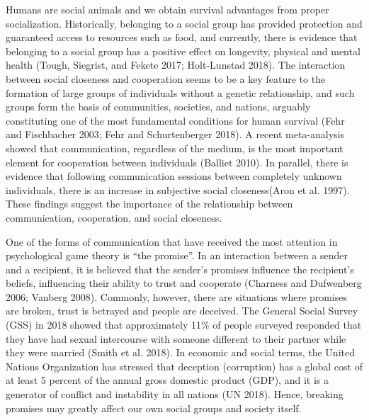 \documentclass[smallextended]{svjour3}       %
\begin{document}
Humans are social animals and we obtain survival advantages from proper
socialization. Historically, belonging to a social group has provided
protection and guaranteed access to resources such as food, and
currently, there is evidence that belonging to a social group has a
positive effect on longevity, physical and mental health (Tough,
Siegrist, and Fekete 2017; Holt-Lunstad 2018). The interaction between
social closeness and cooperation seems to be a key feature to the
formation of large groups of individuals without a genetic relationship,
and such groups form the basis of communities, societies, and nations,
arguably constituting one of the most fundamental conditions for human
survival (Fehr and Fischbacher 2003; Fehr and Schurtenberger 2018). A
recent meta-analysis showed that communication, regardless of the
medium, is the most important element for cooperation between
individuals (Balliet 2010). In parallel, there is evidence that
following communication sessions between completely unknown individuals,
there is an increase in subjective social closeness(Aron et al. 1997).
These findings suggest the importance of the relationship between
communication, cooperation, and social closeness.

One of the forms of communication that have received the most attention
in psychological game theory is ``the promise''. In an interaction
between a sender and a recipient, it is believed that the sender's
promises influence the recipient's beliefs, influencing their ability to
trust and cooperate (Charness and Dufwenberg 2006; Vanberg 2008).
Commonly, however, there are situations where promises are broken, trust
is betrayed and people are deceived. The General Social Survey (GSS) in
2018 showed that approximately 11\% of people surveyed responded that
they have had sexual intercourse with someone different to their partner
while they were married (Smith et al. 2018). In economic and social
terms, the United Nations Organization has stressed that deception
(corruption) has a global cost of at least 5 percent of the annual gross
domestic product (GDP), and it is a generator of conflict and
instability in all nations (UN 2018). Hence, breaking promises may
greatly affect our own social groups and society itself.
\end{document}
